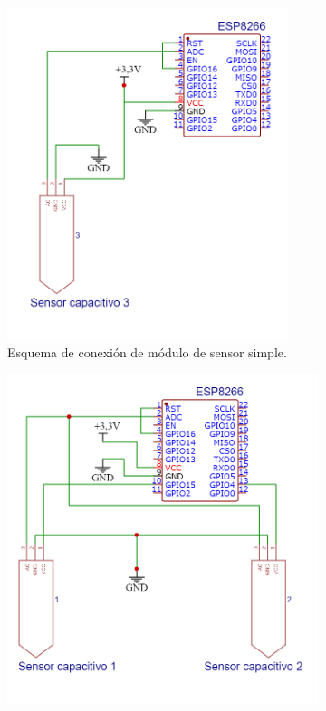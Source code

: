 \begin{figure}[!h]
     \centering
     \begin{subfigure}[b]{0.45\textwidth}
		\centering
		\includegraphics[width=0.9\textwidth]{./Figures/soil_schem_simple.png}
		\caption[Esquema de conexión de módulo de sensor simple]{Esquema de conexión de módulo de sensor simple.}
		\label{fig:soilschem1}
     \end{subfigure}
     \hfill
     \begin{subfigure}[b]{0.45\textwidth}
	\centering
		\includegraphics[width=1\textwidth]{./Figures/soil_schem_doble.png}

\end{subfigure}
\end{figure}

